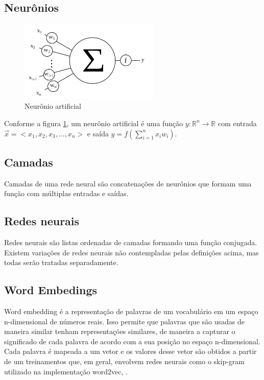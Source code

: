 \subsection{Neurônios}

\begin{figure}[!ht]
	\centering
	\includegraphics[width=0.6\textwidth]{figures/neuron.png}   
	\caption{Neurônio artificial}
	\label{fig:neuron}
\end{figure}


Conforme a figura \ref{fig:neuron}, um neurônio artificial é uma função $y:\mathbb R^n \rightarrow \mathbb R$ com entrada $\vec x = <x_1,x_2,x_3,\dots,x_n>$ e saída $y = f(\sum\limits_{i=1}^n x_iw_i)$.

\subsection{Camadas}
Camadas de uma rede neural são concatenações de neurônios que formam uma função com múltiplas entradas e saídas.

\subsection{Redes neurais}
Redes neurais são listas ordenadas de camadas formando uma função conjugada. Existem variações de redes neurais não contempladas pelas definições acima, mas todas serão tratadas separadamente.

\subsection{Word Embedings}

Word embedding é a representação de palavras de um vocabulário em um espaço n-dimensional de números reais. Isso permite que palavras que são usadas de maneira similar tenham representações similares, de maneira a capturar o significado de cada palavra de acordo com a sua posição no espaço n-dimensional. Cada palavra é mapeada a um vetor e os valores desse vetor são obtidos a partir de um treinamentos que, em geral, envolvem redes neurais como o skip-gram utilizado na implementação word2vec, \cite{DBLP:journals/corr/MikolovSCCD13}.

